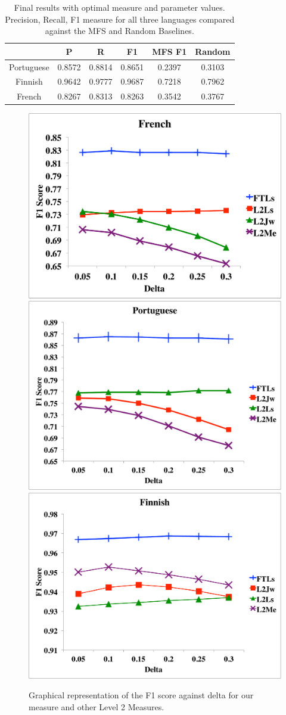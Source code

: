 \documentclass[10pt, a4paper]{article}
\begin{document}
\begin{table}
{\centering \footnotesize
\begin{tabular}{|c|c|c|c|c|c|}
\hline &P&R&F1&MFS F1&Random\\
\hline Portuguese&0.8572&0.8814&0.8651&0.2397&0.3103\\
\hline Finnish&0.9642&0.9777&0.9687&0.7218&0.7962\\
\hline French&0.8267&0.8313&0.8263&0.3542&0.3767\\
\hline 
\end{tabular}
\caption{Final results with optimal measure and parameter values. Precision, Recall, F1 measure for all three languages compared against the MFS and Random Baselines.}
\label{tab:final}
}
\end{table} 

\begin{figure}
\centering
\includegraphics[width=.65\columnwidth]{french}
\includegraphics[width=.65\columnwidth]{portuguese}
\includegraphics[width=.65\columnwidth]{finnish}
\caption{Graphical representation of the F1 score against delta for our measure and other Level 2 Measures.}
\label{fig.2}
\end{figure}
\end{document}
